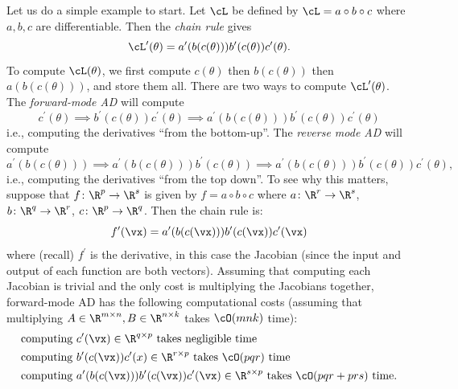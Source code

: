 \documentclass[../../book-main.tex]{subfiles}
\begin{document}
Let us do a simple example to start. Let \(\cL\) be defined by \(\cL
= a \circ b \circ c\) where \(a, b, c\) are differentiable. Then the
\textit{chain rule} gives
\begin{equation}
    \cL^{\prime}(\theta) =
    a^{\prime}(b(c(\theta)))b^{\prime}(c(\theta))c^{\prime}(\theta).
\end{equation}
To compute \(\cL(\theta)\), we first compute \(c(\theta)\) then
\(b(c(\theta))\) then \(a(b(c(\theta)))\), and store them all. There
are two ways to compute \(\cL^{\prime}(\theta)\). The
\textit{forward-mode AD} will compute
\begin{equation}
    c^{\prime}(\theta) \implies
    b^{\prime}(c(\theta))c^{\prime}(\theta) \implies
    a^{\prime}(b(c(\theta)))b^{\prime}(c(\theta))c^{\prime}(\theta)
\end{equation}
i.e., computing the derivatives ``from the bottom-up''. The
\textit{reverse mode AD} will compute
\begin{equation}
    a^{\prime}(b(c(\theta))) \implies
    a^{\prime}(b(c(\theta)))b^{\prime}(c(\theta)) \implies
    a^{\prime}(b(c(\theta)))b^{\prime}(c(\theta))c^{\prime}(\theta),
\end{equation}
i.e., computing the derivatives ``from the top down''. To see why
this matters, suppose that \(f \colon \R^{p} \to \R^{s}\) is given by
\(f = a \circ b \circ c\) where \(a \colon \R^{r} \to \R^{s}\), \(b
\colon \R^{q} \to \R^{r}\), \(c \colon \R^{p} \to \R^{q}\). Then the
chain rule is:
\begin{equation}
    f^{\prime}(\vx) = a^{\prime}(b(c(\vx)))b^{\prime}(c(\vx))c^{\prime}(\vx)
\end{equation}
where (recall) \(f^{\prime}\) is the derivative, in this case the
Jacobian (since the input and output of each function are both
vectors). Assuming that computing each Jacobian is trivial and the
only cost is multiplying the Jacobians together, forward-mode AD has
the following computational costs (assuming that multiplying \(A \in
\R^{m \times n}, B \in \R^{n \times k}\) takes \(\cO(mnk)\) time):
\begin{align}
    &\text{computing}\ c^{\prime}(\vx) \in \R^{q \times
    p}\ \text{takes negligible time} \\
    &\text{computing}\ b^{\prime}(c(\vx))c^{\prime}(x) \in \R^{r
    \times p}\ \text{takes \(\cO(pqr)\) time} \\
    &\text{computing}\ a^{\prime}(b(c(\vx)))b^{\prime}(c(\vx))c^{\prime}(\vx)
    \in \R^{s \times p}\ \text{takes \(\cO(pqr + prs)\) time.}
\end{align}
\end{document}
